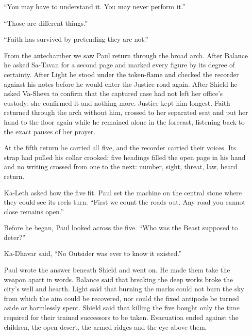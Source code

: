 ``You may have to understand it. You may never perform it.''\par

``Those are different things.''\par

``Faith has survived by pretending they are not.''\par

From the antechamber we saw Paul return through the broad arch. After Balance he asked Sa-Tavan for a second page and marked every figure by its degree of certainty. After Light he stood under the token-flame and checked the recorder against his notes before he would enter the Justice road again. After Shield he asked Va-Sheva to confirm that the captured case had not left her office's custody; she confirmed it and nothing more. Justice kept him longest. Faith returned through the arch without him, crossed to her separated seat and put her hand to the floor again while he remained alone in the forecast, listening back to the exact pauses of her prayer.\par

At the fifth return he carried all five, and the recorder carried their voices. Its strap had pulled his collar crooked; five headings filled the open page in his hand and no writing crossed from one to the next: number, sight, threat, law, heard return.\par

Ka-Leth asked how the five fit. Paul set the machine on the central stone where they could see its reels turn. ``First we count the roads out. Any road you cannot close remains open.''\par

Before he began, Paul looked across the five. ``Who was the Beast supposed to deter?''\par

Ka-Dhavar said, ``No Outsider was ever to know it existed.''\par

Paul wrote the answer beneath Shield and went on. He made them take the weapon apart in words. Balance said that breaking the deep works broke the city's well and hearth. Light said that burning the marks could not burn the sky from which the aim could be recovered, nor could the fixed antipode be turned aside or harmlessly spent. Shield said that killing the five bought only the time required for their trained successors to be taken. Evacuation ended against the children, the open desert, the armed ridges and the eye above them.\par

